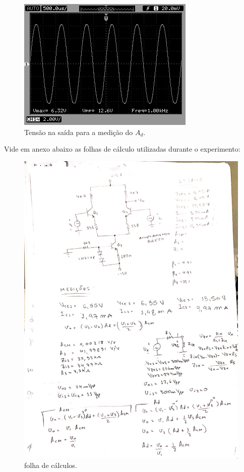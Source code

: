 \begin{figure}[H] 
\includegraphics[scale=1]{imagens/ad.jpg} 
\centering
\caption{Tensão na saída para a medição do $A_{d}$.}
\label{fig:ad} 
\end{figure} 


Vide em anexo abaixo as folhas de cálculo utilizadas durante o experimento:

\begin{figure}[h!] 
\includegraphics[scale=0.5]{imagens/scaner.jpeg} 
\centering
\caption{folha de cálculos.}
\label{calc:1} 
\end{figure} 





     






